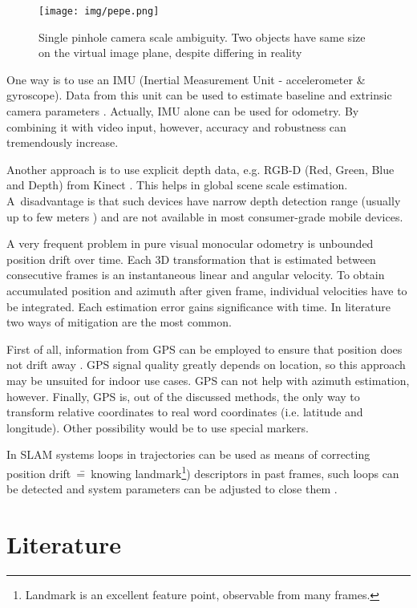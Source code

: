 \begin{figure}[ht]
	\centering\texttt{[image: img/pepe.png]}
	\caption{Single pinhole camera scale ambiguity. Two objects have same size on the virtual image plane, despite differing in reality}
	\label{fig:pepe}
\end{figure}

One way is to use an IMU (Inertial Measurement Unit - accelerometer \& gyroscope). Data from this unit can be used to estimate baseline and extrinsic camera parameters \cite{tracked_vehicles}. Actually, IMU alone can be used for odometry. By combining it with video input, however, accuracy and robustness can tremendously increase.

Another approach is to use explicit depth data, e.g. RGB-D (Red, Green, Blue and Depth) from Kinect \cite{yu2013improved}. This helps in global scene scale estimation. A~disadvantage is that such devices have narrow depth detection range (usually up to few meters \cite{accuracy_and_resoulution}) and are not available in most consumer-grade mobile devices.

A very frequent problem in pure visual monocular odometry is unbounded position drift over time. Each 3D transformation that is estimated between consecutive frames is an instantaneous linear and angular velocity. To obtain accumulated position and azimuth after given frame, individual velocities have to be integrated. Each estimation error gains significance with time. In literature two ways of mitigation are the most common.

First of all, information from GPS can be employed to ensure that position does not drift away \cite{accurate_global_localization}. GPS signal quality greatly depends on location, so this approach may be unsuited for indoor use cases. GPS can not help with azimuth estimation, however. Finally, GPS is, out of the discussed methods, the only way to transform relative coordinates to real word coordinates (i.e. latitude and longitude). Other possibility would be to use special markers.

In SLAM systems loops in trajectories can be used as means of correcting position drift~\==~knowing landmark\footnote{Landmark is an excellent feature point, observable from many frames.}) descriptors in past frames, such loops can be detected and system parameters can be adjusted to close them \cite{the_application_of_kalman} \cite{monoslam}.



\section{Literature}
\label{sec:stateoftheart}


